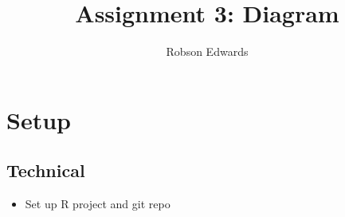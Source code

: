 \documentclass[11pt, oneside]{article}
\title{Assignment 3: Diagram}
\author{Robson Edwards}
\begin{document}
\maketitle

\section{Setup}
\subsection{Technical}
\begin{itemize}
	\item Set up R project and git repo
\end{itemize}
\end{document}
